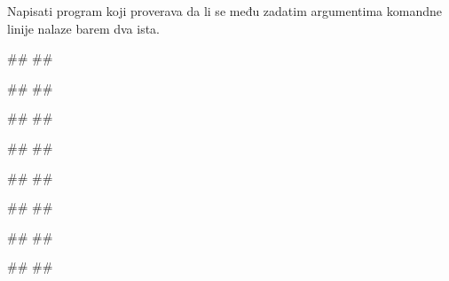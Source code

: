 \begin{Exercise}[label=p2.6_05] 
 Napisati program koji proverava da li se među zadatim argumentima 
 komandne linije nalaze barem dva ista. 
 
\begin{miditest}
\begin{upotreba}{1}
#\naslovPokretanje#
##

#\naslovIzlaz#
##
\end{upotreba}
\end{miditest}
\begin{miditest}
\begin{upotreba}{2}
#\naslovPokretanje#
##

#\naslovIzlaz#
##
\end{upotreba}
\end{miditest}

\begin{miditest}
\begin{upotreba}{3}
#\naslovPokretanje#
##

#\naslovIzlaz#
##
\end{upotreba}
\end{miditest}
\begin{miditest}
\begin{upotreba}{4}
#\naslovPokretanje#
##

#\naslovIzlaz#
##
\end{upotreba}
\end{miditest}

\end{Exercise}
\ifresenja
\begin{Answer}[ref=p2.6_05]
\end{Answer}
 \fi


